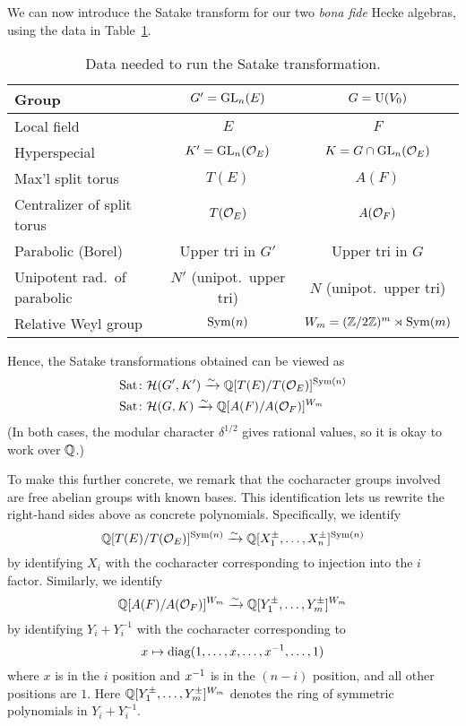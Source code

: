 We can now introduce the Satake transform for our two
\emph{bona fide} Hecke algebras, using the data in Table~\ref{tab:satakestuff}.

\begin{table}[ht]
  \centering
  \begin{tabular}{p{6em}cc}
    \toprule
    Group & $G' = \operatorname{GL}_n(E)$ & $G = \operatorname{U}(V_0)$ \\ \midrule
    Local field & $E$ & $F$ \\\hline
    Hyperspecial & $K' = \operatorname{GL}_n(\mathcal O_E)$ & $K = G \cap \operatorname{GL}_n(\mathcal O_E)$ \\\hline
    Max'l split torus & $T(E)$ & $A(F)$ \\\hline
    Centralizer of split torus & $T(\mathcal O_E)$ & $A(\mathcal O_F)$ \\\hline
    Parabolic (Borel) & Upper tri in $G'$ & Upper tri in $G$ \\\hline
    Unipotent rad.\ of parabolic & $N'$ (unipot.\ upper tri) & $N$ (unipot.\ upper tri) \\\hline
    Relative Weyl group & $\operatorname{Sym}(n)$ & $W_m = (\mathbb Z/2\mathbb Z)^m \rtimes \operatorname{Sym}(m)$ \\
    \bottomrule
  \end{tabular}
  \caption{Data needed to run the Satake transformation.}
  \label{tab:satakestuff}
\end{table}

Hence, the Satake transformations obtained can be viewed as
\begin{align*}
  \operatorname{Sat} &\colon \mathcal H(G', K') \xrightarrow{\sim} \mathbb Q[T(E) / T(\mathcal O_E)]^{\operatorname{Sym}(n)} \\
  \operatorname{Sat} &\colon \mathcal H(G, K)\xrightarrow{\sim} \mathbb Q[A(F) / A(\mathcal O_F)]^{W_m}
\end{align*}
(In both cases, the modular character $\delta^{1/2}$ gives rational values,
so it is okay to work over $\mathbb Q$.)

To make this further concrete, we remark that the cocharacter groups
involved are free abelian groups with known bases.
This identification lets us rewrite the right-hand sides above as concrete polynomials.
Specifically, we identify
\[ \mathbb Q[T(E) / T(\mathcal O_E)]^{\operatorname{Sym}(n)}
  \xrightarrow{\sim} \mathbb Q[X_1^\pm, \dots, X_n^\pm]^{\operatorname{Sym}(n)} \]
by identifying $X_i$ with the
cocharacter corresponding to injection into the $i$ factor.
Similarly, we identify
\[ \mathbb Q[A(F) / A(\mathcal O_F)]^{W_m}
  \xrightarrow{\sim} \mathbb Q[Y_1^{\pm}, \dots, Y_m^{\pm}]^{W_m} \]
by identifying $Y_i + Y_i^{-1}$
with the cocharacter corresponding to
\[ x \mapsto \operatorname{diag}(1, \dots, x, \dots, x^{-1}, \dots, 1) \]
where $x$ is in the $i$ position and $x^{-1}$ is in the $(n-i)$ position,
and all other positions are $1$.
Here $\mathbb Q[Y_1^{\pm}, \dots, Y_m^{\pm}]^{W_m}$
denotes the ring of symmetric polynomials in $Y_i + Y_i^{-1}$.

